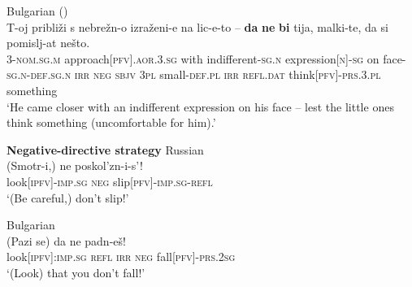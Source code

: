 \documentclass[output=paper,colorlinks,citecolor=brown]{langscibook}
\begin{document}
\ea\label{ex:wiemer2} \textnormal{Bulgarian (\citealt[147]{Ivanova2014})}\\
\gll T-oj približi s nebrežn-o izraženi-e na lic-e-to -- \textbf{da} \textbf{ne} \textbf{bi} tija, malki-te, da si pomislj-at nešto. \\
3-\textsc{nom.sg.m} approach\textsc{[pfv].aor.3.sg} with indifferent-\textsc{sg.n} expression\textsc{[n]-sg} on face-\textsc{sg.n-def.sg.n} {} \textsc{irr} \textsc{neg} \textsc{sbjv} \textsc{3pl} small-\textsc{def.pl} \textsc{irr} \textsc{refl.dat} think\textsc{[pfv]-prs.3.pl} something \\
\glt `He came closer with an indifferent expression on his face -- lest the little ones think something (uncomfortable for him).'
\z

\noindent \textbf{Negative-directive strategy}
\ea\label{ex:wiemer3}
\textnormal{Russian} \\
\gll (Smotr-i,) ne poskol'zn-i-s'! \\
look\textsc{[ipfv]-imp.sg} \textsc{neg} slip\textsc{[pfv]-imp.sg-refl} \\
\glt `(Be careful,) don't slip!'
\z

\ea \textnormal{Bulgarian} \\
\label{ex:wiemer4}
\gll (Pazi se) da ne padn-eš! \\
look\textsc{[ipfv]:imp.sg} \textsc{refl} \textsc{irr} \textsc{neg} fall\textsc{[pfv]-prs.2sg} \\
\glt `(Look) that you don't fall!'
\z
\end{document}
